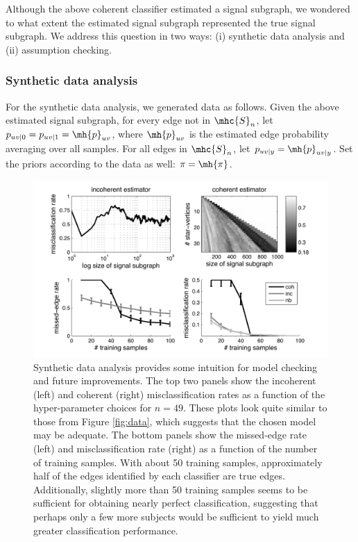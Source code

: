 \documentclass[10pt,journal,cspaper,compsoc]{IEEEtran}
\begin{document}
Although the above coherent classifier estimated a signal subgraph, we wondered to what extent the estimated signal subgraph represented the true signal subgraph.  We address this question in two ways:  (i) synthetic data analysis and (ii) assumption checking.  

\subsubsection{Synthetic data analysis} %
\label{ssub:synthetic_data_analysis}

For the synthetic data analysis, we generated data as follows.  Given the above estimated signal subgraph, for every edge not in $\mhc{S}_{n}$, let $p_{uv|0}=p_{uv|1}=\mh{p}_{uv}$, where $\mh{p}_{uv}$ is the estimated edge probability averaging over all samples.  For all edges in $\mhc{S}_{n}$, let $p_{uv|y}=\mh{p}_{uv|y}$.  Set the priors according to the data as well: $\pi=\mh{\pi}$.  

\begin{figure}[tb!]
	\centering
		\includegraphics[width=0.7\linewidth]{../figs/BLSA0317_Count_synthetic_Lhats.pdf}
	\caption{Synthetic data analysis provides some intuition for model checking and future improvements.  The top two panels show the incoherent (left) and coherent (right) misclassification rates as a function of the hyper-parameter choices for $n=49$.  These plots look quite similar to those from Figure \ref{fig:data}, which suggests that the chosen model may be adequate.  The bottom panels show the missed-edge rate (left) and misclassification rate (right) as a function of the number of training samples.  With about 50 training samples, approximately half of the edges identified by each classifier are true edges.  Additionally, slightly more than 50 training samples seems to be sufficient for obtaining nearly perfect classification, suggesting that perhaps only a few more subjects would be sufficient to yield much greater classification performance.}
	\label{fig:synthetic}
\end{figure}
\end{document}

